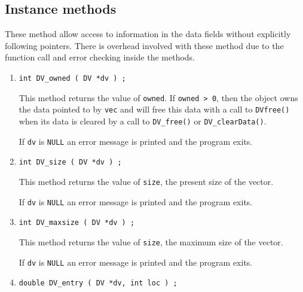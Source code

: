 \subsection{Instance methods}
\label{subsection:DV:proto:Instance}
\par
These method allow access to information in the data fields without
explicitly following pointers.
There is overhead involved with these method due to the function
call and error checking inside the methods.
\par
\begin{enumerate}
\item
\begin{verbatim}
int DV_owned ( DV *dv ) ;
\end{verbatim}
This method returns the value of {\tt owned}.
If {\tt owned > 0}, 
then the object owns the data pointed to by {\tt vec}
and will free this data with a call to {\tt DVfree()} when its data
is cleared by a call to {\tt DV\_free()} or {\tt DV\_clearData()}.
\par {}
If {\tt dv} is {\tt NULL}
an error message is printed and the program exits.
\item
\begin{verbatim}
int DV_size ( DV *dv ) ;
\end{verbatim}
This method returns the value of {\tt size},
the present size of the vector.
\par {}
If {\tt dv} is {\tt NULL}
an error message is printed and the program exits.
\item
\begin{verbatim}
int DV_maxsize ( DV *dv ) ;
\end{verbatim}
This method returns the value of {\tt size},
the maximum size of the vector.
\par {}
If {\tt dv} is {\tt NULL}
an error message is printed and the program exits.
\item
\begin{verbatim}
double DV_entry ( DV *dv, int loc ) ;

\end{verbatim}
\end{enumerate}
